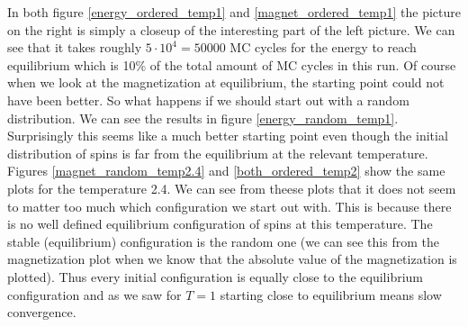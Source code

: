 \documentclass[a4paper,english, 10pt, twoside]{article}
\begin{document}
In both figure \ref{energy_ordered_temp1} and \ref{magnet_ordered_temp1} the picture on the right is simply a closeup of 
the interesting part of the left picture. We can see that it takes roughly $5\cdot10^4 = 50 000$ MC cycles for the energy to 
reach equilibrium which is 10\% of the total amount of MC cycles in this run. Of course when we look at the magnetization 
at equilibrium, the starting point could not have been better. So what happens if we should start out with a random distribution. 
We can see the results in figure \ref{energy_random_temp1}. Surprisingly this seems like a much better starting point even though
the initial distribution of spins is far from the equilibrium at the relevant temperature. Figures \ref{magnet_random_temp2.4}
and \ref{both_ordered_temp2} show the same plots for the temperature 2.4. We can see from theese plots that it does not seem 
to matter too much which configuration we start out with. This is because there is no well defined equilibrium configuration of 
spins at this temperature. The stable (equilibrium) configuration is the random one (we can see this from the magnetization plot 
when we know that the absolute value of the magnetization is plotted). Thus every initial configuration is equally close to the 
equilibrium configuration and as we saw for $T = 1$ starting close to equilibrium means slow convergence.
\end{document}
